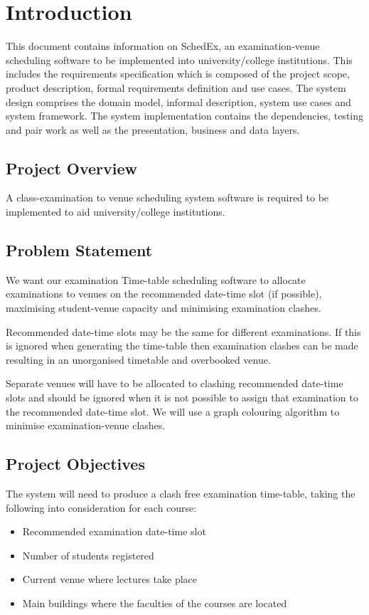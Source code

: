 \documentclass{article}
\begin{document}
\tableofcontents
{}
\cleardoublepage{}
\pagebreak

\section{Introduction}
This document contains information on SchedEx, an examination-venue scheduling software to be implemented into university/college institutions. This includes the requirements specification which is composed of the project scope, product description, formal requirements definition and use cases. The system design comprises the domain model, informal description, system use cases and system framework. The system implementation contains the dependencies, testing and pair work as well as the presentation, business and data layers.

\subsection{Project Overview}
A class-examination to venue scheduling system software is required to be implemented to aid university/college institutions.

\subsection{Problem Statement}
We want our examination Time-table scheduling software to allocate examinations to venues on the recommended date-time slot (if possible), maximising student-venue capacity and minimising examination clashes.

Recommended date-time slots may be the same for different examinations. If this is ignored when generating the time-table then examination clashes can be made resulting in an unorganised timetable and overbooked venue.

Separate venues will have to be allocated to clashing recommended date-time slots and should be ignored when it is not possible to assign that examination to the recommended date-time slot. We will use a graph colouring algorithm to minimise examination-venue clashes.

\subsection{Project Objectives}
The system will need to produce a clash free examination time-table, taking the following into consideration for each course:
\begin{itemize}
\item Recommended examination date-time slot
\item Number of students registered
\item Current venue where lectures take place
\item Main buildings where the faculties of the courses are located
\end{itemize}
\end{document}
